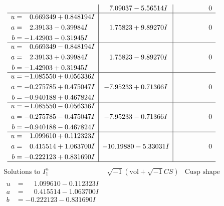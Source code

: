 \documentclass[1p]{elsarticle_modified}
\theoremstyle{definition}
\newcommand{\I}{\sqrt{-1}}
\begin{document}
$$\begin{array}{c|c|c}
 & \phantom{-}7.09037 - 5.56514 I & \phantom{-0.000000 } 0 \\ \hline\begin{aligned}
u &= \phantom{-}0.669349 + 0.848194 I \\
a &= \phantom{-}2.39133 - 0.39984 I \\
b &= -1.42903 - 0.31945 I\end{aligned}
 & \phantom{-}1.75823 + 9.89270 I & \phantom{-0.000000 } 0 \\ \hline\begin{aligned}
u &= \phantom{-}0.669349 - 0.848194 I \\
a &= \phantom{-}2.39133 + 0.39984 I \\
b &= -1.42903 + 0.31945 I\end{aligned}
 & \phantom{-}1.75823 - 9.89270 I & \phantom{-0.000000 } 0 \\ \hline\begin{aligned}
u &= -1.085550 + 0.056336 I \\
a &= -0.275785 + 0.475047 I \\
b &= -0.940188 + 0.467824 I\end{aligned}
 & -7.95233 + 0.71366 I & \phantom{-0.000000 } 0 \\ \hline\begin{aligned}
u &= -1.085550 - 0.056336 I \\
a &= -0.275785 - 0.475047 I \\
b &= -0.940188 - 0.467824 I\end{aligned}
 & -7.95233 - 0.71366 I & \phantom{-0.000000 } 0 \\ \hline\begin{aligned}
u &= \phantom{-}1.099610 + 0.112323 I \\
a &= \phantom{-}0.415514 + 1.063700 I \\
b &= -0.222123 + 0.831690 I\end{aligned}
 & -10.19880 - 5.33031 I & \phantom{-0.000000 } 0\\
 \hline 
 \end{array}$$\newpage$$\begin{array}{c|c|c}  
\text{Solutions to }I^u_{1}& \I (\text{vol} + \sqrt{-1}CS) & \text{Cusp shape}\\
 \hline 
\begin{aligned}
u &= \phantom{-}1.099610 - 0.112323 I \\
a &= \phantom{-}0.415514 - 1.063700 I \\
b &= -0.222123 - 0.831690 I\end{aligned}

\end{array}$$
\end{document}
